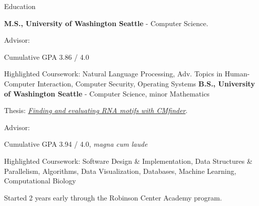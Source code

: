 \begin{rubric}{Education}

	\textbf{M.S., University of Washington Seattle} - Computer Science.
    \par Advisor: \pWeldD{}
    \par Cumulative GPA 3.86 / 4.0
    \par Highlighted Coursework: Natural Language Processing, Adv. Topics in Human-Computer Interaction, Computer Security, Operating Systems
\entry*[2016 -- 2019] %
	\textbf{B.S., University of Washington Seattle} - Computer Science, minor Mathematics
	\par Thesis: \href{https://cephcyn.github.io/pub/2019-bachelors_thesis-Finding_and_evaluating_RNA_motifs_with_CMfinder.pdf}{\emph{Finding and evaluating RNA motifs with CMfinder}}.
	\par Advisor: \pRuzzoL{}
	\par Cumulative GPA 3.94 / 4.0, \textit{magna cum laude}
	\par Highlighted Coursework: Software Design \& Implementation, Data Structures \& Parallelism, Algorithms, Data Visualization, Databases, Machine Learning, Computational Biology
	\par Started 2 years early through the Robinson Center Academy program.
\end{rubric}
